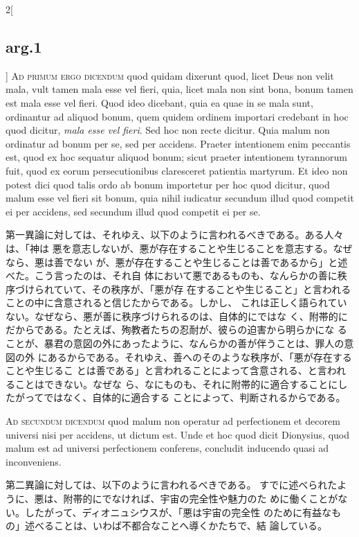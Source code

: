 \documentclass[paper=a4paper,fontsize=10pt,jafontsize=9pt,titlepage]{jlreq}
\begin{document}
\begin{paracol}{2}[\subsection{arg.1}]
{\scshape Ad primum ergo dicendum} quod quidam dixerunt quod, licet Deus non
velit mala, vult tamen mala esse vel fieri, quia, licet mala non sint bona,
bonum tamen est mala esse vel fieri. Quod ideo dicebant, quia ea quae in se mala
sunt, ordinantur ad aliquod bonum, quem quidem ordinem importari credebant in
hoc quod dicitur, {\itshape mala esse vel fieri}. Sed hoc non recte
dicitur. Quia malum non ordinatur ad bonum per se, sed per accidens. Praeter
intentionem enim peccantis est, quod ex hoc sequatur aliquod bonum; sicut
praeter intentionem tyrannorum fuit, quod ex eorum persecutionibus claresceret
patientia martyrum. Et ideo non potest dici quod talis ordo ab bonum importetur
per hoc quod dicitur, quod malum esse vel fieri sit bonum, quia nihil iudicatur
secundum illud quod competit ei per accidens, sed secundum illud quod competit
ei per se.

\switchcolumn

第一異論に対しては、それゆえ、以下のように言われるべきである。ある人々は、「神は
悪を意志しないが、悪が存在することや生じることを意志する。なぜなら、悪は善でない
が、悪が存在することや生じることは善であるから」と述べた。こう言ったのは、それ自
体において悪であるものも、なんらかの善に秩序づけられていて、その秩序が、「悪が存
在することや生じること」と言われることの中に含意されると信じたからである。しかし、
これは正しく語られていない。なぜなら、悪が善に秩序づけられるのは、自体的にではな
く、附帯的にだからである。たとえば、殉教者たちの忍耐が、彼らの迫害から明らかにな
ることが、暴君の意図の外にあったように、なんらかの善が伴うことは、罪人の意図の外
にあるからである。それゆえ、善へのそのような秩序が、「悪が存在することや生じるこ
とは善である」と言われることによって含意される、と言われることはできない。なぜな
ら、なにものも、それに附帯的に適合することにしたがってではなく、自体的に適合する
ことによって、判断されるからである。

\switchcolumn*[\subsection{ad.2}]


{\scshape Ad secundum dicendum} quod malum non operatur ad perfectionem et
decorem universi nisi per accidens, ut dictum est. Unde et hoc quod dicit
Dionysius, quod malum est ad universi perfectionem conferens, concludit
inducendo quasi ad inconveniens.

\switchcolumn

第二異論に対しては、以下のように言われるべきである。
すでに述べられたように、悪は、附帯的にでなければ、宇宙の完全性や魅力のた
 めに働くことがない。したがって、ディオニュシウスが、「悪は宇宙の完全性
 のために有益なもの」述べることは、いわば不都合なことへ導くかたちで、結
 論している。


\end{paracol}
\end{document}
